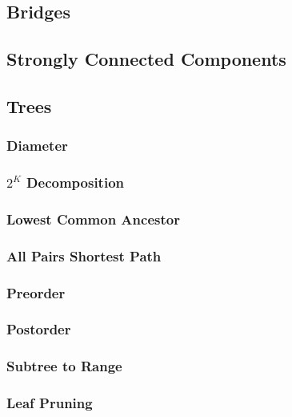 \documentclass{article}
\begin{document}
\subsection{Bridges}

\subsection{Strongly Connected Components}


\subsection{Trees}
\subsubsection{Diameter}

\subsubsection{$2^{K}$ Decomposition}

\subsubsection{Lowest Common Ancestor}

\subsubsection{All Pairs Shortest Path}

\subsubsection{Preorder}

\subsubsection{Postorder}

\subsubsection{Subtree to Range}

\subsubsection{Leaf Pruning}

\end{document}
